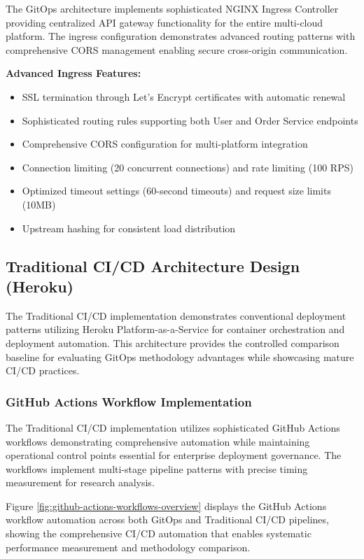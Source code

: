 The GitOps architecture implements sophisticated NGINX Ingress Controller providing centralized API gateway functionality for the entire multi-cloud platform. The ingress configuration demonstrates advanced routing patterns with comprehensive CORS management enabling secure cross-origin communication.

\textbf{Advanced Ingress Features:}
\begin{itemize}
\item SSL termination through Let's Encrypt certificates with automatic renewal
\item Sophisticated routing rules supporting both User and Order Service endpoints
\item Comprehensive CORS configuration for multi-platform integration
\item Connection limiting (20 concurrent connections) and rate limiting (100 RPS)
\item Optimized timeout settings (60-second timeouts) and request size limits (10MB)
\item Upstream hashing for consistent load distribution
\end{itemize}

\subsection{Traditional CI/CD Architecture Design (Heroku)}

The Traditional CI/CD implementation demonstrates conventional deployment patterns utilizing Heroku Platform-as-a-Service for container orchestration and deployment automation. This architecture provides the controlled comparison baseline for evaluating GitOps methodology advantages while showcasing mature CI/CD practices.

\subsubsection{GitHub Actions Workflow Implementation}

The Traditional CI/CD implementation utilizes sophisticated GitHub Actions workflows demonstrating comprehensive automation while maintaining operational control points essential for enterprise deployment governance. The workflows implement multi-stage pipeline patterns with precise timing measurement for research analysis.

Figure \ref{fig:github-actions-workflows-overview} displays the GitHub Actions workflow automation across both GitOps and Traditional CI/CD pipelines, showing the comprehensive CI/CD automation that enables systematic performance measurement and methodology comparison.

